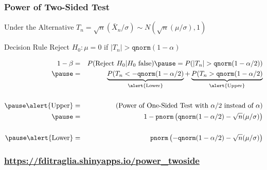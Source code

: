 \documentclass[handout]{beamer}
\begin{document}
\begin{frame}
	\frametitle{Power of Two-Sided Test}
\footnotesize
\begin{block}
	{Under the Alternative}
	$T_n = \sqrt{n}(\bar{X}_n/\sigma) \sim N\left( \sqrt{n}(\mu/\sigma),1  \right)$
\end{block}
\begin{block}
	{Decision Rule}
	Reject $H_0\colon \mu = 0$ if $|T_n|> \texttt{qnorm}(1- \alpha)$  
\end{block}
\begin{eqnarray*}
	1 - \beta &=& P(\mbox{Reject } H_0|H_0 \mbox{ false}) \pause = P(|T_n| >\texttt{qnorm}(1- \alpha/2))\\ \pause
		&=&\underbrace{P(T_n < -\texttt{qnorm}(1- \alpha/2)}_{\text{\alert{Lower}}} + \underbrace{P(T_n >\texttt{qnorm}(1- \alpha/2)}_{\text{\alert{Upper}}}\\ \\ \pause
	\mbox{\alert{Upper}} &=& (\mbox{Power of One-Sided Test with } \alpha/2 \mbox{ instead of } \alpha)\\ \pause
		&=& 1 - \texttt{pnorm}\left( \texttt{qnorm}(1 - \alpha/2) - \sqrt{n}(\mu/\sigma) \right) \\ \\ \pause
	\mbox{\alert{Lower}} &=& \texttt{pnorm}\left(-\texttt{qnorm}(1 - \alpha/2) - \sqrt{n}(\mu/\sigma) \right) \\
\end{eqnarray*}

\end{frame}
\begin{frame}
	\frametitle{\href{https://fditraglia.shinyapps.io/power_twoside}{https://fditraglia.shinyapps.io/power\_twoside}}

\begin{figure}
\end{figure}

\end{frame}
\end{document}
